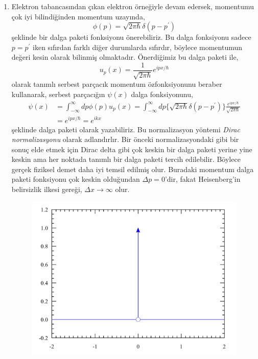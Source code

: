 \documentclass[a4paper,12pt, twoside]{article}
\begin{document}
\begin{enumerate}
	
	\item Elektron tabancasından çıkan elektron örneğiyle devam edersek, momentumu çok iyi bilindiğinden momentum uzayında,
	\begin{equation}
	\phi ( p ) = \sqrt { 2 \pi \hbar } \delta ( p - p^\prime )
	\end{equation}
	şeklinde bir dalga paketi fonksiyonu önerebiliriz. Bu dalga fonksiyonu sadece $p=p^\prime$ iken sıfırdan farklı diğer durumlarda sıfırdır, böylece momentumun değeri kesin olarak bilinmiş olmaktadır.
	Önerdiğimiz bu dalga paketi ile,
	\begin{equation}
	u _ { p } ( x ) = \frac { 1 } { \sqrt { 2 \pi \hbar } } e ^ { i p x / \hbar }
	\end{equation}
	olarak tanımlı serbest parçacık momentum özfonksiyonunu beraber kullanarak, serbest parçacığın $\psi(x)$ dalga fonksiyonunu,
	\begin{align}
	\psi ( x )  
	&= \int _ { - \infty } ^ { \infty } d p \phi ( p ) u_p(x)
	= \int _ { - \infty } ^ { \infty } d p  \{\sqrt { 2 \pi \hbar } \delta ( p - p^\prime )\} \frac { e ^ { i p x /\hbar } } { \sqrt { 2 \pi \hbar } }\\
	&= e ^ { i p x /\hbar } =  e ^ { i k x }
	\end{align}
	şeklinde dalga paketi olarak yazabiliriz. Bu normalizasyon yöntemi \emph{Dirac normalizasyonu} olarak adlandırlır. Bir önceki normalizasyondaki gibi bir sonuç elde etmek için Dirac delta gibi çok keskin bir dalga paketi yerine yine keskin ama her noktada tanımlı bir dalga paketi tercih edilebilir. Böylece gerçek fiziksel demet daha iyi temsil edilmiş olur. Buradaki momentum dalga paketi fonksiyonu çok keskin olduğundan $\Delta p = 0$'dir, fakat Heisenberg'in belirsizlik ilkesi gereği, $\Delta x \rightarrow \infty$ olur.
	\begin{figure}[hbtp]	
	\begin{minipage}{.45\textwidth}
	\centering
	\includegraphics[width=.9\linewidth]{Dirac_distribution_PDF.pdf}

\end{minipage}
\end{figure}
\end{enumerate}
\end{document}
